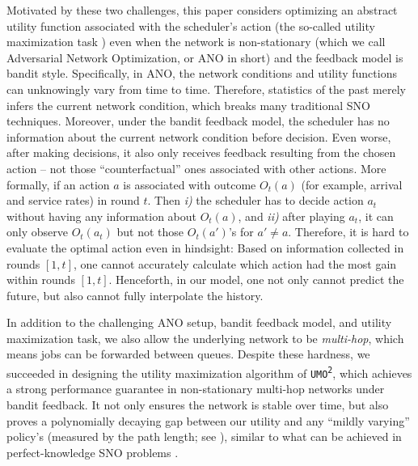 \documentclass[11pt,fullpage,letterpaper]{article} %
\newcommand{\UMAlg}{\texttt{UMO}\textsuperscript{\texttt{2}}\xspace}
\begin{document}
Motivated by these two challenges, this paper considers optimizing an abstract utility function associated with the scheduler's action (the so-called utility maximization task \citep{neely2008fairness}) even when the network is non-stationary (which we call Adversarial Network Optimization, or ANO in short) and the feedback model is bandit style.
Specifically, in ANO, the network conditions and utility functions can unknowingly vary from time to time. Therefore, statistics of the past merely infers the current network condition, which breaks many traditional SNO techniques.
Moreover, under the bandit feedback model, the scheduler has no information about the current network condition before decision. Even worse, after making decisions, it also only receives feedback resulting from the chosen action -- not those ``counterfactual'' ones associated with other actions. 
More formally, if an action $a$ is associated with outcome $O_t(a)$ (for example, arrival and service rates) in round $t$. Then \textit{i)} the scheduler has to decide action $a_t$ without having any information about $O_t(a)$, and \textit{ii)} after playing $a_t$, it can only observe $O_t(a_t)$ but not those $O_t(a')$'s for $a'\neq a$.
Therefore, it is hard to evaluate the optimal action even in hindsight: Based on information collected in rounds $[1,t]$, one cannot accurately calculate which action had the most gain within rounds $[1,t]$.
Henceforth, in our model, one not only cannot predict the future, but also cannot fully interpolate the history.

In addition to the challenging ANO setup, bandit feedback model, and utility maximization task, we also allow the underlying network  to be \textit{multi-hop}, which means jobs can be forwarded between queues.
Despite these hardness, we succeeded in designing the utility maximization algorithm of \UMAlg, which achieves a strong performance guarantee in non-stationary multi-hop networks under bandit feedback. It not only ensures the network is stable over time, but also proves a polynomially decaying gap between our utility and any 
``mildly varying'' policy's (measured by the path length; see ), similar to what can be achieved in perfect-knowledge SNO problems \citep{neely2008fairness}.
\end{document}
